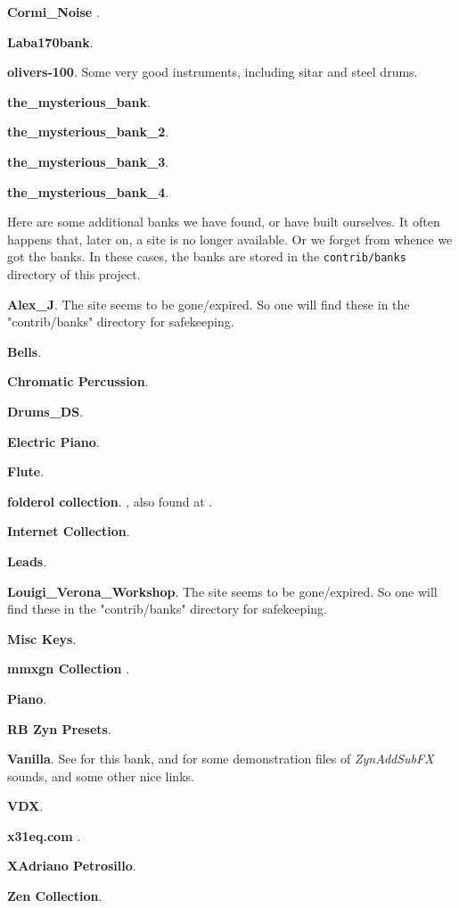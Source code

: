    \begin{enumber}
      \item \textbf{Cormi\_Noise} \cite{cormi}.
      \item \textbf{Laba170bank}.
      \item \textbf{olivers-100}.
         Some very good instruments, including sitar
         and steel drums.
      \item \textbf{the\_mysterious\_bank}.
      \item \textbf{the\_mysterious\_bank\_2}.
      \item \textbf{the\_mysterious\_bank\_3}.
      \item \textbf{the\_mysterious\_bank\_4}.
   \end{enumber}

   Here are some additional banks we have found, or have built ourselves.
   It often happens that, later on, a site is no longer available.
   Or we forget from whence we got the banks.
   In these cases, the banks are stored in the \texttt{contrib/banks}
   directory of this project.

   \begin{enumber}
      \item \textbf{Alex\_J}.
         The site seems to be gone/expired. So one will find these in the
         "contrib/banks" directory for safekeeping.
      \item \textbf{Bells}.
      \item \textbf{Chromatic Percussion}.
      \item \textbf{Drums\_DS}.
      \item \textbf{Electric Piano}.
      \item \textbf{Flute}.
      \item \textbf{folderol collection}.
         \cite{folderol}, also found at \cite{zyndemos}.
      \item \textbf{Internet Collection}.
      \item \textbf{Leads}.
      \item \textbf{Louigi\_Verona\_Workshop}.
         The site seems to be gone/expired. So one will find these in the
         "contrib/banks" directory for safekeeping.
      \item \textbf{Misc Keys}.
      \item \textbf{mmxgn Collection} \cite{mmxgn}.
      \item \textbf{Piano}.
      \item \textbf{RB Zyn Presets}.
      \item \textbf{Vanilla}.
         See \cite{zyndemos} for this bank, and for some demonstration files
         of \textsl{ZynAddSubFX} sounds, and some other nice links.
      \item \textbf{VDX}.
      \item \textbf{x31eq.com} \cite{x31eq}.
      \item \textbf{XAdriano Petrosillo}.
      \item \textbf{Zen Collection}.
   \end{enumber}

